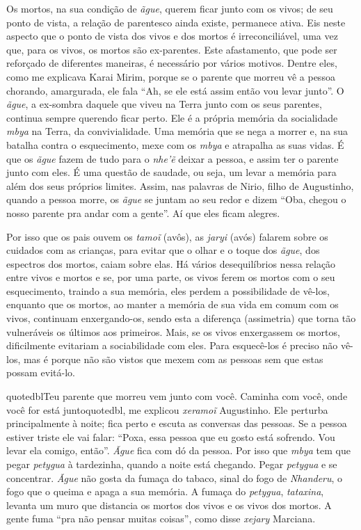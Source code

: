 Os mortos, na sua condição de \emph{ãgue}, querem ficar junto com os vivos; de
seu ponto de vista, a relação de parentesco ainda existe, permanece
ativa. Eis neste aspecto que o ponto de vista dos vivos e dos mortos é
irreconciliável, uma vez que, para os vivos, os mortos são ex-parentes. 
Este afastamento, que pode ser reforçado de diferentes maneiras, é
necessário por vários motivos. Dentre eles, como me explicava Karai
Mirim, porque se o parente que morreu vê a pessoa chorando, amargurada,
ele fala ``Ah, se ele está assim então vou levar junto''. O \emph{ãgue}, a
ex-sombra daquele que viveu na Terra junto com os seus parentes,
continua sempre querendo ficar perto. Ele é a própria memória da
socialidade \emph{mbya} na Terra, da convivialidade. Uma memória que se nega a
morrer e, na sua batalha contra o esquecimento, mexe com os \emph{mbya} e
atrapalha as suas vidas. É que os \emph{ãgue} fazem de tudo para o \emph{nhe’ẽ}
deixar a pessoa, e assim ter o parente junto com eles. É uma questão de
saudade, ou seja, um levar a memória para além dos seus próprios
limites. Assim, nas palavras de Nirio, filho de Augustinho, quando a
pessoa morre, os \emph{ãgue} se juntam ao seu redor e dizem ``Oba, chegou o
nosso parente pra andar com a gente''. Aí que eles ficam alegres.

Por isso que os pais ouvem os \emph{tamoĩ} (avôs), as \emph{jaryi} (avós) falarem
sobre os cuidados com as crianças, para evitar que o olhar e o toque
dos \emph{ãgue}, dos espectros dos mortos, caiam sobre elas. Há vários
desequilíbrios nessa relação entre vivos e mortos e se, por uma parte,
os vivos ferem os mortos com o seu esquecimento, traindo a sua memória,
eles perdem a possibilidade de vê-los, enquanto que os mortos, ao
manter a memória de sua vida em comum com os vivos, continuam
enxergando-os, sendo esta a diferença (assimetria) que torna tão
vulneráveis os últimos aos primeiros. Mais, se os vivos enxergassem os
mortos, dificilmente evitariam a sociabilidade com eles. Para
esquecê-los é preciso não vê-los, mas é porque não são vistos que mexem
com as pessoas sem que estas possam evitá-lo.

{quotedbl}Teu parente que morreu vem junto com você. Caminha com
você, onde você for está junto{quotedbl}, me explicou \emph{xeramoĩ}
Augustinho. Ele perturba principalmente à noite; fica perto e escuta as
conversas das pessoas. Se a pessoa estiver triste ele vai falar: ``Poxa,
essa pessoa que eu gosto está sofrendo. Vou levar ela comigo, então''.
\emph{Ãgue} fica com dó da pessoa. Por isso que \emph{mbya} tem que pegar \emph{petygua}
à tardezinha, quando a noite está chegando. Pegar \emph{petygua} e se
concentrar. \emph{Ãgue} não gosta da fumaça do tabaco, sinal do fogo de
\emph{Nhanderu}, o fogo que o queima e apaga a sua memória. A fumaça do
\emph{petygua}, \emph{tataxina}, levanta um muro que distancia os mortos dos
vivos e os vivos dos mortos. A gente fuma ``pra não pensar muitas
coisas'', como disse \emph{xejary} Marciana.

